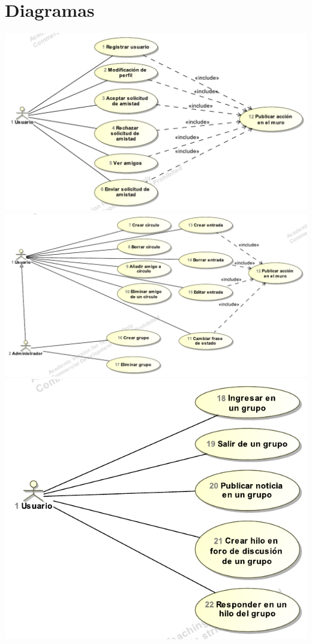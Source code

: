 \documentclass[12pt, a4paper, titlepage]{article}
\begin{document}
\section{Diagramas}

\includegraphics[width=\textwidth]{Imagenes/casosUso1}
\includegraphics[width=\textwidth]{Imagenes/casosUso2}
\includegraphics[width=\textwidth]{Imagenes/casosUso3}
\end{document}
